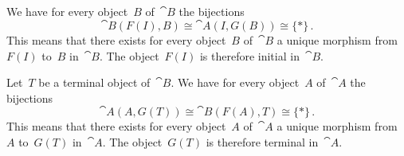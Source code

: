 \subsection{}

We have for every object~$B$ of~$\cat{B}$ the bijections
\[
	\cat{B}(F(I), B)
	≅
	\cat{A}(I, G(B))
	≅
	\{ * \} \,.
\]
This means that there exists for every object~$B$ of~$\cat{B}$ a unique morphism from~$F(I)$ to~$B$ in~$\cat{B}$.
The object~$F(I)$ is therefore initial in~$\cat{B}$.

Let~$T$ be a terminal object of~$\cat{B}$.
We have for every object~$A$ of~$\cat{A}$ the bijections
\[
	\cat{A}(A, G(T))
	≅
	\cat{B}(F(A), T)
	≅
	\{ * \} \,.
\]
This means that there exists for every object~$A$ of~$\cat{A}$ a unique morphism from~$A$ to~$G(T)$ in~$\cat{A}$.
The object~$G(T)$ is therefore terminal in~$\cat{A}$.
